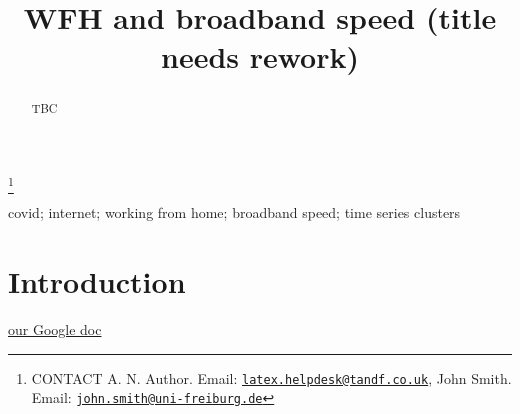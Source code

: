 \documentclass[]{interact}
\theoremstyle{plain}%
\theoremstyle{definition}
\theoremstyle{remark}
\begin{document}

\title{WFH and broadband speed (title needs rework)}


\author{
}

\thanks{CONTACT A. N. Author. Email: \href{mailto:latex.helpdesk@tandf.co.uk}{\nolinkurl{latex.helpdesk@tandf.co.uk}}, John Smith. Email: \href{mailto:john.smith@uni-freiburg.de}{\nolinkurl{john.smith@uni-freiburg.de}}}

\maketitle

\begin{abstract}
TBC
\end{abstract}

\begin{keywords}
covid; internet; working from home; broadband speed; time series
clusters
\end{keywords}

\hypertarget{introduction}{%
\section{Introduction}\label{introduction}}

\href{https://docs.google.com/document/d/1PWjkmgzWGYKR9wFogKYw7l-8mZLoORt593x-Tu-f2-M/edit\#heading=h.i5om1o8wpcd9}{our
Google doc}
\end{document}
